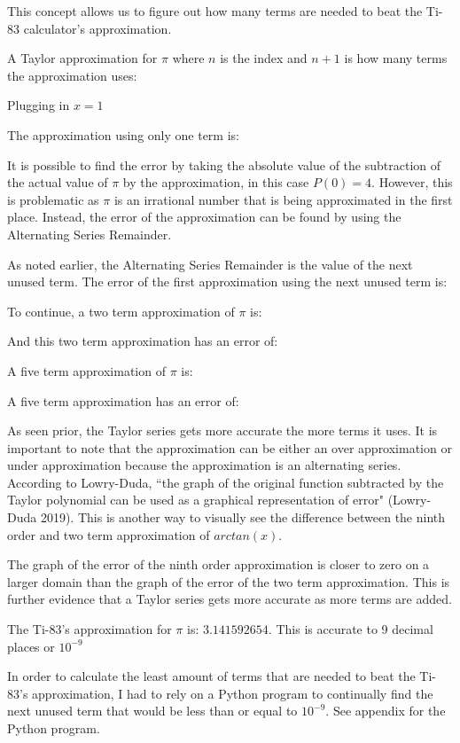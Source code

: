 This concept allows us to figure out how many terms are needed to beat the Ti-83 calculator's approximation.

A Taylor approximation for \(\pi\) where \(n\) is the index and \(n + 1\) is how many terms the approximation uses:

Plugging in \(x = 1\)

The approximation using only one term is:


It is possible to find the error by taking the absolute value of  the subtraction of the actual value of \(\pi\) by the approximation, in this case \(P(0) = 4\). However, this is problematic as \(\pi\) is an irrational number that is being approximated in the first place. Instead, the error of the approximation can be found by using the Alternating Series Remainder.

As noted earlier, the Alternating Series Remainder is the value of the next unused term. The error of the first approximation using the next unused term is:

To continue, a two term approximation of \(\pi\) is:


And this two term approximation has an error of:


A five term approximation of \(\pi\) is:


A five term approximation has an error of: 


As seen prior, the Taylor series gets more accurate the more terms it uses. It is important to note that the approximation can be either an over approximation or under approximation because the approximation is an alternating series. According to Lowry-Duda, ``the graph of the original function subtracted by the Taylor polynomial can be used as a graphical representation of error" (Lowry-Duda 2019). This is another way to visually see the difference between the ninth order and two term approximation of \(arctan(x)\). 



The graph of the error of the ninth order approximation is closer to zero on a larger domain than the graph of the error of the two term approximation. This is further evidence that a Taylor series gets more accurate as more terms are added.

The Ti-83's approximation for \(\pi\) is: \(3.141592654\). This is accurate to 9 decimal places or \(10^{-9}\)

In order to calculate the least amount of terms that are needed to beat the Ti-83's approximation, I had to rely on a Python program to continually find the next unused term that would be less than or equal to \(10^{-9}\). See appendix for the Python program.

